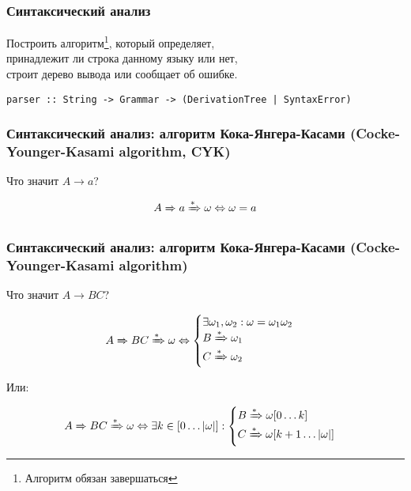\documentclass{beamer}
\newcommand{\derives}[1][*]{\xRightarrow[]{#1}}
\begin{document}
\begin{frame}[fragile]
  \transwipe[direction=90]
  \frametitle{Синтаксический анализ}
\begin{center}
  Построить алгоритм\footnote[1]{Алгоритм обязан завершаться}, который определяет, \\ принадлежит ли строка данному языку или нет, \\
  строит дерево вывода или сообщает об ошибке.
\end{center}

\vspace{0.6cm}

\begin{center}
\begin{minipage}{\textwidth}
\begin{verbatim}
parser :: String -> Grammar -> (DerivationTree | SyntaxError)
\end{verbatim}
\end{minipage}
\end{center}

\end{frame}

\begin{frame}[fragile]
  \transwipe[direction=90]
  \frametitle{Синтаксический анализ: алгоритм Кока-Янгера-Касами (Cocke-Younger-Kasami algorithm, CYK)}

  \begin{center}
    Что значит $A \to a$?
  \end{center} \pause

 \[ A \derives[]  a  \derives \omega \Leftrightarrow \omega = a \]
\end{frame}

\begin{frame}[fragile]
  \transwipe[direction=90]
  \frametitle{Синтаксический анализ: алгоритм Кока-Янгера-Касами (Cocke-Younger-Kasami algorithm)}

  \begin{center}
    Что значит $A \to BC$?
  \end{center} \pause

  \[
    A \derives[]  BC  \derives \omega \Leftrightarrow
              \begin{cases}
                \exists \omega_1, \omega_2: \omega = \omega_1 \omega_2\\
                B \derives \omega_1\\
                C \derives \omega_2
              \end{cases}
  \] \pause


  \begin{center}
    Или:
  \end{center}

  \[
    A \derives[]  BC  \derives \omega \Leftrightarrow \exists k \in [0 \dots |\omega|]:
              \begin{cases}
                B \derives \omega[0 \dots k]\\
                C \derives \omega[k+1 \dots |\omega|]
              \end{cases}
  \]

\end{frame}
\end{document}
